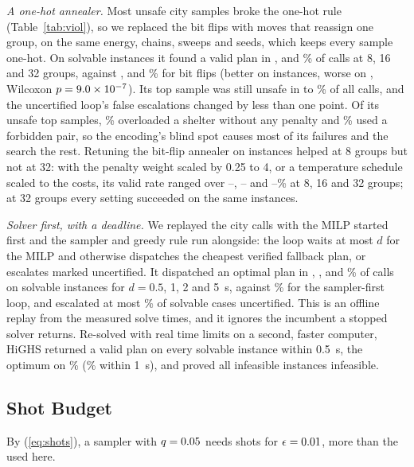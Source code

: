 \documentclass[conference]{IEEEtran}
\begin{document}
\textit{A one-hot annealer.} Most unsafe city samples broke the one-hot rule (Table~\ref{tab:viol}), so we replaced the bit flips with moves that reassign one group, on the same energy, chains, sweeps and seeds, which keeps every sample one-hot. On solvable instances it found a valid plan in \OhValidEight, \OhValidSixteen{} and \OhValidThirtyTwo\% of calls at 8, 16 and 32 groups, against \OhValidOldEight, \OhValidOldSixteen{} and \OhValidOldThirtyTwo\% for bit flips (better on \OhBetter{} instances, worse on \OhWorse, Wilcoxon $p=9.0\times10^{-7}$). Its top sample was still unsafe in \OhUnsafeEight{} to \OhUnsafeThirtyTwo\% of all calls, and the uncertified loop's false escalations changed by less than one point. Of its unsafe top samples, \OhClsBlind\% overloaded a shelter without any penalty and \OhClsForb\% used a forbidden pair, so the encoding's blind spot causes most of its failures and the search the rest. Retuning the bit-flip annealer on \SwN{} instances helped at 8 groups but not at 32: with the penalty weight scaled by 0.25 to 4, or a temperature schedule scaled to the costs, its valid rate ranged over \SwMinEight--\SwMaxEight, \SwMinSixteen--\SwMaxSixteen{} and \SwMinThirtyTwo--\SwMaxThirtyTwo\% at 8, 16 and 32 groups; at 32 groups every setting succeeded on the same \SwBigInst{} instances.

\textit{Solver first, with a deadline.} We replayed the city calls with the MILP started first and the sampler and greedy rule run alongside: the loop waits at most $d$ for the MILP and otherwise dispatches the cheapest verified fallback plan, or escalates marked uncertified. It dispatched an optimal plan in \DfOptHalf, \DfOptOne, \DfOptTwo{} and \DfOptFive\% of calls on solvable instances for $d=0.5$, 1, 2 and 5~s, against \LoopOpt\% for the sampler-first loop, and escalated at most \DfUncHalf\% of solvable cases uncertified. This is an offline replay from the measured solve times, and it ignores the incumbent a stopped solver returns. Re-solved with real time limits on a second, faster computer, HiGHS returned a valid plan on every solvable instance within 0.5~s, the optimum on \RdOptHalf\% (\RdOptOne\% within 1~s), and proved all \RdInfHalf{} infeasible instances infeasible.

\subsection{Shot Budget}
\ShotText{} By (\ref{eq:shots}), a sampler with $q=0.05$ needs \ShotNeed{} shots for $\epsilon=0.01$, more than the \Shots{} used here.
\end{document}
